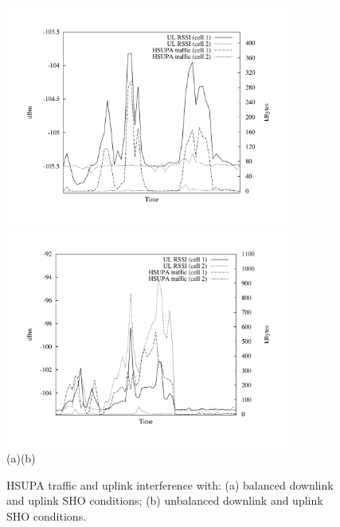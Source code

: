 \begin{figure}[tp]
\centering

\includegraphics[width=3.7in]{07-experimental_evaluation-sho_balancing/img/network_normal}\includegraphics[width=3.7in]{07-experimental_evaluation-sho_balancing/img/network_problem}\\\vskip -0.3in(a)\hspace*{3.6in}(b)

\caption{HSUPA traffic and uplink interference with: (a) balanced downlink
and uplink SHO conditions; (b) unbalanced downlink and uplink SHO
conditions.\label{fig:problem_illustration}}
\end{figure}


